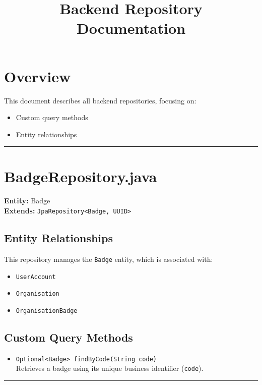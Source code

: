 \documentclass[12pt]{article}
\title{Backend Repository Documentation}
\author{}
\date{}
\begin{document}
\maketitle

\section*{Overview}

This document describes all backend repositories, focusing on:
\begin{itemize}
    \item Custom query methods
    \item Entity relationships
\end{itemize}

\hrule
\vspace{1em}

\section{BadgeRepository.java}

\textbf{Entity:} Badge \\
\textbf{Extends:} \texttt{JpaRepository<Badge, UUID>}

\subsection*{Entity Relationships}
This repository manages the \texttt{Badge} entity, which is associated with:
\begin{itemize}
    \item \texttt{UserAccount}
    \item \texttt{Organisation}
    \item \texttt{OrganisationBadge}

\end{itemize}

\subsection*{Custom Query Methods}
\begin{itemize}
    \item \texttt{Optional<Badge> findByCode(String code)} \\
    Retrieves a badge using its unique business identifier (\texttt{code}).
\end{itemize}

\hrule
\vspace{1em}
\end{document}
